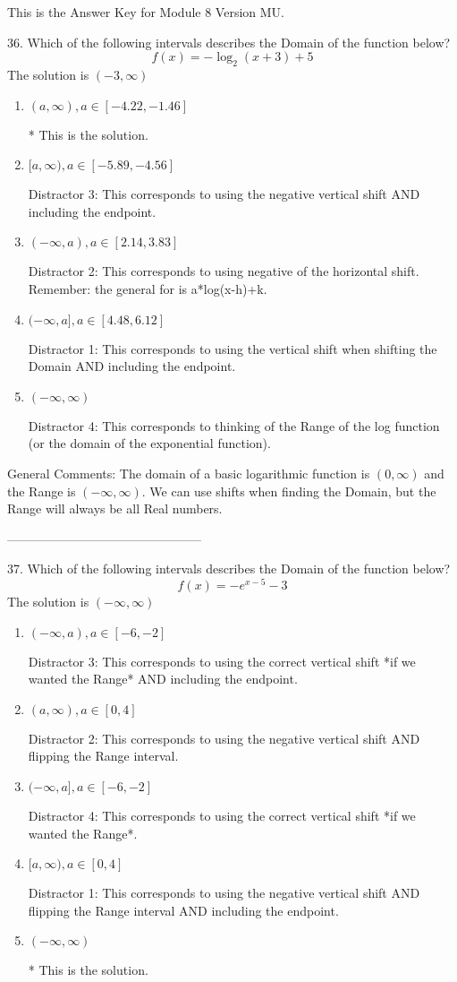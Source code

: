 \documentclass{article}[10pt]
\begin{document}
This is the Answer Key for Module 8 Version MU.

36. Which of the following intervals describes the Domain of the function below?
$$ f(x) = -\log_2{(x+3)}+5 $$ 
The solution is $ (-3, \infty) $ 

\begin{enumerate}[label=\Alph*.] 
\item $ (a, \infty), a \in [-4.22, -1.46] $ 

 * This is the solution. 
\item $ [a, \infty), a \in [-5.89, -4.56] $ 

  Distractor 3: This corresponds to using the negative vertical shift AND including the endpoint. 
\item $ (-\infty, a), a \in [2.14, 3.83] $ 

  Distractor 2: This corresponds to using negative of the horizontal shift. Remember: the general for is a*log(x-h)+k. 
\item $ (-\infty, a], a \in [4.48, 6.12] $ 

  Distractor 1: This corresponds to using the vertical shift when shifting the Domain AND including the endpoint. 
\item $ (-\infty, \infty) $ 

 Distractor 4: This corresponds to thinking of the Range of the log function (or the domain of the exponential function). 
\end{enumerate} 
 
General Comments: The domain of a basic logarithmic function is $(0, \infty)$ and the Range is $(-\infty, \infty)$. We can use shifts when finding the Domain, but the Range will always be all Real numbers.

-----------------------------------------------

37. Which of the following intervals describes the Domain of the function below?
$$ f(x) = -e^{x-5}-3 $$ 
The solution is $ (-\infty, \infty) $ 

\begin{enumerate}[label=\Alph*.] 
\item $ (-\infty, a), a \in [-6, -2] $ 

  Distractor 3: This corresponds to using the correct vertical shift *if we wanted the Range* AND including the endpoint. 
\item $ (a, \infty), a \in [0, 4] $ 

  Distractor 2: This corresponds to using the negative vertical shift AND flipping the Range interval. 
\item $ (-\infty, a], a \in [-6, -2] $ 

  Distractor 4: This corresponds to using the correct vertical shift *if we wanted the Range*. 
\item $ [a, \infty), a \in [0, 4] $ 

  Distractor 1: This corresponds to using the negative vertical shift AND flipping the Range interval AND including the endpoint. 
\item $ (-\infty, \infty) $ 

 * This is the solution. 
\end{enumerate} 
 
\end{document}
